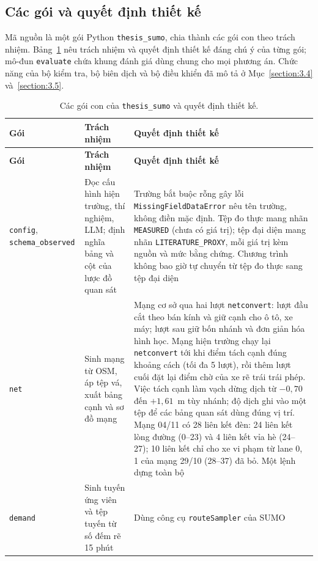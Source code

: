 \documentclass[../main.tex]{subfiles}
\begin{document}
\subsection{Các gói và quyết định thiết kế}
\label{subsection:package_design}

Mã nguồn là một gói Python \texttt{thesis\_sumo}, chia thành các gói con theo trách nhiệm. Bảng~\ref{table:4.1} nêu trách nhiệm và quyết định thiết kế đáng chú ý của từng gói; mô-đun \texttt{evaluate} chứa khung đánh giá dùng chung cho mọi phương án. Chức năng của bộ kiểm tra, bộ biên dịch và bộ điều khiển đã mô tả ở Mục~\ref{section:3.4} và~\ref{section:3.5}.

\begingroup\small
\begin{longtable}{|p{2.3cm}|p{4.2cm}|p{7.5cm}|}
\caption{Các gói con của \texttt{thesis\_sumo} và quyết định thiết kế.}\label{table:4.1}\\
\hline
\textbf{Gói} & \textbf{Trách nhiệm} & \textbf{Quyết định thiết kế} \\ \hline
\endfirsthead
\hline
\textbf{Gói} & \textbf{Trách nhiệm} & \textbf{Quyết định thiết kế} \\ \hline
\endhead
\texttt{config}, \texttt{schema\_\allowbreak observed} & Đọc cấu hình hiện trường, thí nghiệm, LLM; định nghĩa bảng và cột của lược đồ quan sát & Trường bắt buộc rỗng gây lỗi \texttt{MissingFieldDataError} nêu tên trường, không điền mặc định. Tệp đo thực mang nhãn \texttt{MEASURED} (chưa có giá trị); tệp đại diện mang nhãn \texttt{LITERATURE\_PROXY}, mỗi giá trị kèm nguồn và mức bằng chứng. Chương trình không bao giờ tự chuyển từ tệp đo thực sang tệp đại diện \\ \hline
\texttt{net} & Sinh mạng từ OSM, áp tệp vá, xuất bảng cạnh và sơ đồ mạng & Mạng cơ sở qua hai lượt \texttt{netconvert}: lượt đầu cắt theo bán kính và giữ cạnh cho ô tô, xe máy; lượt sau giữ bốn nhánh và đơn giản hóa hình học. Mạng hiện trường chạy lại \texttt{netconvert} tới khi điểm tách cạnh đúng khoảng cách (tối đa 5 lượt), rồi thêm lượt cuối đặt lại điểm chờ của xe rẽ trái trái phép. Việc tách cạnh làm vạch dừng dịch từ $-0{,}70$ đến $+1{,}61$~m tùy nhánh; độ dịch ghi vào một tệp để các bảng quan sát dùng đúng vị trí. Mạng 04/11 có 28 liên kết đèn: 24 liên kết lòng đường (0--23) và 4 liên kết vỉa hè (24--27); 10 liên kết chỉ cho xe vi phạm từ lane 0, 1 của mạng 29/10 (28--37) đã bỏ. Một lệnh dựng toàn bộ \\ \hline
\texttt{demand} & Sinh tuyến ứng viên và tệp tuyến từ số đếm rẽ 15 phút & Dùng công cụ \texttt{routeSampler} của SUMO \\ \hline

\end{longtable}
\end{document}
